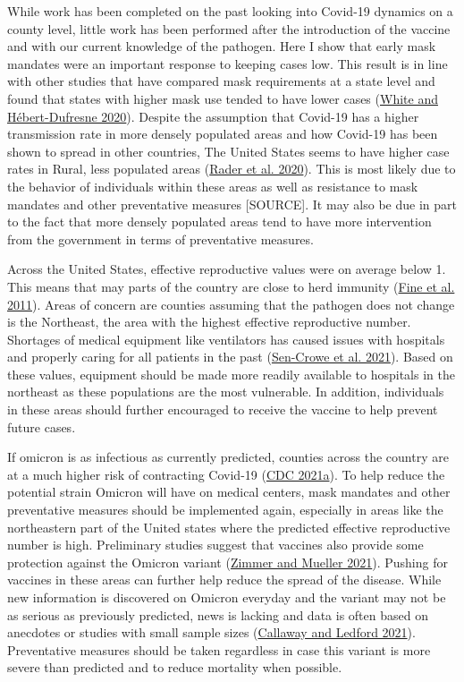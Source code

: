 \documentclass[
  12pt,
]{article}
\begin{document}
While work has been completed on the past looking into Covid-19 dynamics on a county level, little work has been performed after the introduction of the vaccine and with our current knowledge of the pathogen. Here I show that early mask mandates were an important response to keeping cases low. This result is in line with other studies that have compared mask requirements at a state level and found that states with higher mask use tended to have lower cases (\protect\hyperlink{ref-white_state-level_2020}{White and Hébert-Dufresne 2020}). Despite the assumption that Covid-19 has a higher transmission rate in more densely populated areas and how Covid-19 has been shown to spread in other countries, The United States seems to have higher case rates in Rural, less populated areas (\protect\hyperlink{ref-rader_crowding_2020}{Rader et al. 2020}). This is most likely due to the behavior of individuals within these areas as well as resistance to mask mandates and other preventative measures {[}SOURCE{]}. It may also be due in part to the fact that more densely populated areas tend to have more intervention from the government in terms of preventative measures.

Across the United States, effective reproductive values were on average below 1. This means that may parts of the country are close to herd immunity (\protect\hyperlink{ref-fine_herd_2011}{Fine et al. 2011}). Areas of concern are counties assuming that the pathogen does not change is the Northeast, the area with the highest effective reproductive number. Shortages of medical equipment like ventilators has caused issues with hospitals and properly caring for all patients in the past (\protect\hyperlink{ref-sen-crowe_closer_2021}{Sen-Crowe et al. 2021}). Based on these values, equipment should be made more readily available to hospitals in the northeast as these populations are the most vulnerable. In addition, individuals in these areas should further encouraged to receive the vaccine to help prevent future cases.

If omicron is as infectious as currently predicted, counties across the country are at a much higher risk of contracting Covid-19 (\protect\hyperlink{ref-cdc_omicron_2021}{CDC 2021a}). To help reduce the potential strain Omicron will have on medical centers, mask mandates and other preventative measures should be implemented again, especially in areas like the northeastern part of the United states where the predicted effective reproductive number is high. Preliminary studies suggest that vaccines also provide some protection against the Omicron variant (\protect\hyperlink{ref-zimmer_covid_2021}{Zimmer and Mueller 2021}). Pushing for vaccines in these areas can further help reduce the spread of the disease. While new information is discovered on Omicron everyday and the variant may not be as serious as previously predicted, news is lacking and data is often based on anecdotes or studies with small sample sizes (\protect\hyperlink{ref-callaway_how_2021}{Callaway and Ledford 2021}). Preventative measures should be taken regardless in case this variant is more severe than predicted and to reduce mortality when possible.
\end{document}
